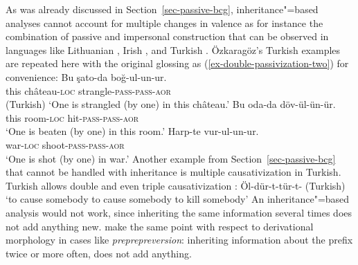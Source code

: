 \begin{exe}
\begin{xlist}[iv.]
\begin{exe}
\begin{xlist}[iv.]
As was already discussed in Section~\ref{sec-passive-bcg}, inheritance"=based analyses cannot
account for multiple changes in valence as for instance the combination of passive and impersonal
construction that can be observed in languages like Lithuanian
\citep[Section~5]{Timberlake82a}, Irish \citep{Noonan94a}, and Turkish
\citep{Ozkaragoez86a}. Özkaragöz's Turkish examples are repeated here with the original glossing as
(\ref{ex-double-passivization-two}) for convenience:
\eal\label{ex-double-passivization-two}
\ex\label{ex-double-passivization-strangle-two}
\gll Bu şato-da boğ-ul-un-ur.\\
     this château-\textsc{loc} strangle-\textsc{pass}-\textsc{pass}-\textsc{aor}\\\hfill(Turkish)
\glt `One is strangled (by one) in this château.'
\ex\label{ex-double-passivization-hit-two}
\gll Bu oda-da döv-ül-ün-ür.\\
     this room-\textsc{loc} hit-\textsc{pass}-\textsc{pass}-\textsc{aor}\\
\glt `One is beaten (by one) in this room.'
\ex
\gll Harp-te vur-ul-un-ur.\\
     war-\textsc{loc} shoot-\textsc{pass}-\textsc{pass}-\textsc{aor}\\
\glt `One is shot (by one) in war.'
\zl
\addlines
Another example from Section~\ref{sec-passive-bcg} that cannot be handled with inheritance is multiple causativization in
Turkish. Turkish allows double and even triple causativization \citep[]{Lewis67a-u}: 
\ea
Öl-dür-t-tür-t- \hfill(Turkish)\\
`to cause somebody to cause somebody to kill somebody' 
\z 
An inheritance"=based analysis would not work, since inheriting the same information several times
does not add anything new. \citet{KN93a} make the same point with respect to derivational morphology
in cases like \emph{preprepreversion}: inheriting information about the prefix  twice or
more often, does not add anything.


\end{xlist}
\end{exe}
\end{xlist}
\end{exe}
